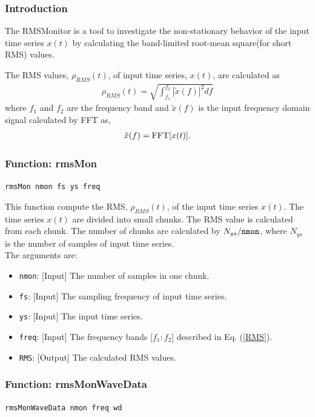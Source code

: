 \subsubsection{\bf Introduction}
The RMSMonitor is a tool to investigate the non-stationary behavior of the input time series $x(t)$ by calculating the band-limited root-mean square(for short RMS) values.

The RMS values, $\rho_{RMS}(t)$, of input time series, $x(t)$, are calculated as 
\begin{align}
	\rho_{RMS}(t) = \sqrt{ \int_{f_1}^{f_2} |\tilde{x}(f)|^2 df } \label{RMS}
\end{align}
where $f_1$ and $f_2$ are the frequency band and $\tilde{x}(f)$ is the input frequency domain signal calculated by FFT as,
\begin{align*}
  \tilde{x}(f) = {\rm FFT}[x(t)].
\end{align*}


\subsubsection{{\bf Function:} rmsMon}
{\tt rmsMon nmon fs ys freq\\}

This function compute the RMS, $\rho_{RMS}(t)$, of the input time series $x(t)$.
The time series $x(t)$ are divided into small chunks. The RMS value is calculated from each chunk. The number of chunks are calculated by $ N_{ys} / {\tt nmon}$, where $N_{ys}$ is the number of samples of input time series.\\
The arguments are:
\begin{itemize}
\item {\tt nmon}: [Input] The number of samples in one chunk.
\item {\tt fs}: [Input] The sampling frequency of input time series.
\item {\tt ys}: [Input] The input time series.
\item {\tt freq}: [Input] The frequency bands [$f_1:f_2$] described in Eq. (\ref{RMS}). 
\item {\tt {RMS}}: [Output] The calculated RMS values. 
\end{itemize}


\subsubsection{{\bf Function:} rmsMonWaveData}
{\tt rmsMonWaveData nmon freq wd\\}

